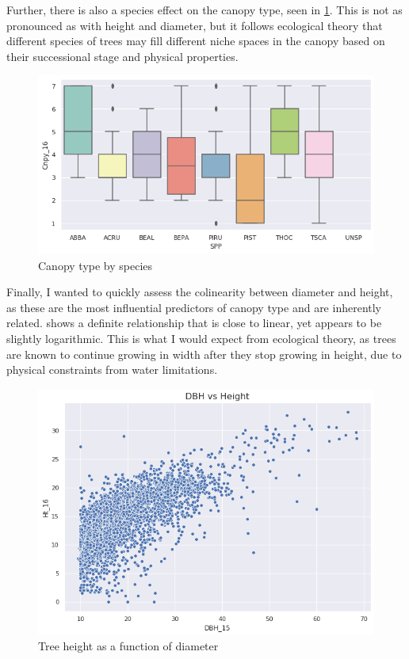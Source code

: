 \documentclass[11pt,a4paper]{article}
\begin{document}
Further, there is also a species effect on the canopy type, seen in \cref{Height_and_DBH_by_Canopy_BoxPlot}.  This is not as pronounced as with height and diameter, but it follows ecological theory that different species of trees may fill different niche spaces in the canopy based on their successional stage and physical properties.  

\begin{figure}[H]
\centering
\includegraphics[scale=.4]{../figures/update1/Canopy_by_Species_BoxPlot.png}
\caption{Canopy type by species}
\label{Height_and_DBH_by_Canopy_BoxPlot} 
\end{figure}

Finally, I wanted to quickly assess the colinearity between diameter and height, as these are the most influential predictors of canopy type and are inherently related.   shows a definite relationship that is close to linear, yet appears to be slightly logarithmic.  This is what I would expect from ecological theory, as trees are known to continue growing in width after they stop growing in height, due to physical constraints from water limitations.

\begin{figure}[H]
\centering
\includegraphics[scale=.5]{../figures/update1/Height_DBH_ScatterPlot.png}
\caption{Tree height as a function of diameter}
\label{Height_DBH_ScatterPlot} 
\end{figure}
\end{document}

